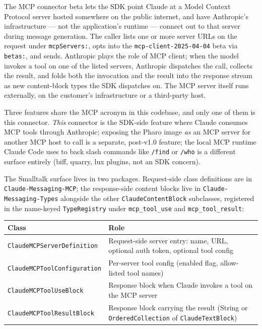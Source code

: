 \documentclass[a4paper,10pt,fleqn]{article}
\newcommand{\pkg}[1]{\texttt{#1}}
\begin{document}
The MCP connector beta lets the SDK point Claude at a Model
Context Protocol server hosted somewhere on the public internet,
and have Anthropic's infrastructure --- not the application's
runtime --- connect out to that server during message generation.
The caller lists one or more server URLs on the request under
\texttt{mcpServers:}, opts into the
\texttt{mcp-client-2025-04-04} beta via \texttt{betas:}, and
sends.  Anthropic plays the role of MCP client; when the model
invokes a tool on one of the listed servers, Anthropic dispatches
the call, collects the result, and folds both the invocation and
the result into the response stream as new content-block types
the SDK dispatches on.  The MCP server itself runs externally, on
the customer's infrastructure or a third-party host.

Three features share the MCP acronym in this codebase, and only
one of them is this connector.  \emph{This} connector is the
SDK-side feature where Claude consumes MCP tools through
Anthropic; exposing the Pharo image \emph{as} an MCP server for
another MCP host to call is a separate, post-v1.0 feature; the
local MCP runtime Claude Code uses to back slash commands like
\texttt{/find} or \texttt{/who} is a different surface entirely
(biff, quarry, lux plugins, not an SDK concern).

\begin{sloppypar}
The Smalltalk surface lives in two packages.  Request-side class
definitions are in \pkg{Claude-Messaging-MCP}; the response-side
content blocks live in \pkg{Claude-Messaging-Types} alongside the
other \texttt{ClaudeContentBlock} subclasses, registered in the
name-keyed \texttt{TypeRegistry} under \texttt{mcp\_tool\_use}
and \texttt{mcp\_tool\_result}:
\end{sloppypar}

\begin{center}
\begin{tabular}{@{}lp{6.5cm}@{}}
\toprule
\textbf{Class} & \textbf{Role} \\
\midrule
\texttt{ClaudeMCPServerDefinition}   & Request-side server entry:
  name, URL, optional auth token, optional tool config \\
\texttt{ClaudeMCPToolConfiguration}  & Per-server tool config
  (enabled flag, allow-listed tool names) \\
\texttt{ClaudeMCPToolUseBlock}       & Response block when Claude
  invokes a tool on the MCP server \\
\texttt{ClaudeMCPToolResultBlock}    & Response block carrying the
  result (String or \texttt{OrderedCollection} of
  \texttt{ClaudeTextBlock}) \\
\bottomrule
\end{tabular}
\end{center}
\end{document}
